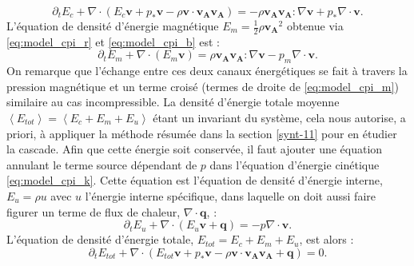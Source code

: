 \begin{equation}
 \label{eq:model_cpi_k}   \partial_t E_c +\nabla \cdot \left(E_c \boldsymbol{v} + p_* \boldsymbol{v}- \rho \boldsymbol{v} \cdot \boldsymbol{v_A}\boldsymbol{v_A}\right)   = -  \rho \boldsymbol{v_A}  \boldsymbol{v_A} : \nabla \boldsymbol{v} + p_* \nabla \cdot \boldsymbol{v}.
\end{equation}
L'équation de densité d'énergie magnétique $E_m = \frac{1}{2}\rho \boldsymbol{v_A}^2$ obtenue via \eqref{eq:model_cpi_r} et \eqref{eq:model_cpi_b} est :
\begin{equation}
  \label{eq:model_cpi_m}   \partial_t E_m  +\nabla   \cdot  \left(E_m\boldsymbol{v}\right)  = \rho  \boldsymbol{v_A}\boldsymbol{v_A}  : \nabla \boldsymbol{v}- p_m  \nabla \cdot \boldsymbol{v}.
\end{equation}
On remarque que l'échange entre ces deux canaux énergétiques se fait à travers la pression magnétique et un terme croisé (termes de droite de \eqref{eq:model_cpi_m}) similaire au cas incompressible. La densité d'énergie totale moyenne $\left<E_{tot}\right> = \left< E_c + E_m + E_u\right>$ étant un invariant du système, cela nous autorise, a priori, à appliquer la méthode résumée dans la section \ref{synt-11} pour en étudier la cascade. Afin que cette énergie soit conservée, il faut ajouter une équation annulant le terme source dépendant de $p$ dans l'équation d'énergie cinétique \eqref{eq:model_cpi_k}. Cette équation est l'équation de densité d'énergie interne, $E_u = \rho u$ avec $u$ l'énergie interne spécifique, dans laquelle on doit aussi faire figurer un terme de flux de chaleur, $\nabla \cdot \boldsymbol{q}$, :
\begin{equation}
   \label{eq:model_cpi_u}  \partial_t E_u +\nabla \cdot \left(E_u \boldsymbol{v} + \boldsymbol{q}\right)   = - p \nabla \cdot \boldsymbol{v}.
\end{equation}
L'équation de densité d'énergie totale, $E_{tot} = E_c + E_m + E_u$, est alors : 
\begin{equation}
   \label{eq:model_cpi_e}  \partial_t E_{tot} +\nabla \cdot \left(E_{tot} \boldsymbol{v} + p_* \boldsymbol{v}- \rho \boldsymbol{v} \cdot \boldsymbol{v_A}\boldsymbol{v_A} + \boldsymbol{q}\right)   = 0.
\end{equation}
